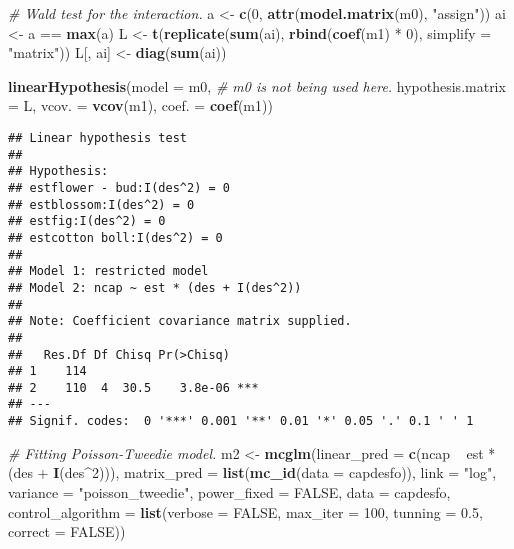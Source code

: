 \documentclass[9pt,a5paper,]{book}
\newenvironment{Shaded}{}{}
\newcommand{\KeywordTok}[1]{\textbf{{#1}}}
\newcommand{\DataTypeTok}[1]{\underline{{#1}}}
\newcommand{\DecValTok}[1]{{#1}}
\newcommand{\FloatTok}[1]{{#1}}
\newcommand{\StringTok}[1]{{#1}}
\newcommand{\CommentTok}[1]{\textit{{#1}}}
\newcommand{\OtherTok}[1]{{#1}}
\newcommand{\NormalTok}[1]{{#1}}
\renewenvironment{Shaded}{\color{inputcolor}}{}
\renewcommand{\DataTypeTok}[1]{{#1}}
\theoremstyle{definition}
\theoremstyle{definition}
\theoremstyle{remark}
\begin{document}
\begin{Shaded}
\begin{Highlighting}[]
\CommentTok{# Wald test for the interaction.}
\NormalTok{a <-}\StringTok{ }\KeywordTok{c}\NormalTok{(}\DecValTok{0}\NormalTok{, }\KeywordTok{attr}\NormalTok{(}\KeywordTok{model.matrix}\NormalTok{(m0), }\StringTok{"assign"}\NormalTok{))}
\NormalTok{ai <-}\StringTok{ }\NormalTok{a ==}\StringTok{ }\KeywordTok{max}\NormalTok{(a)}
\NormalTok{L <-}\StringTok{ }\KeywordTok{t}\NormalTok{(}\KeywordTok{replicate}\NormalTok{(}\KeywordTok{sum}\NormalTok{(ai), }\KeywordTok{rbind}\NormalTok{(}\KeywordTok{coef}\NormalTok{(m1) *}\StringTok{ }\DecValTok{0}\NormalTok{), }\DataTypeTok{simplify =} \StringTok{"matrix"}\NormalTok{))}
\NormalTok{L[, ai] <-}\StringTok{ }\KeywordTok{diag}\NormalTok{(}\KeywordTok{sum}\NormalTok{(ai))}

\KeywordTok{linearHypothesis}\NormalTok{(}\DataTypeTok{model =} \NormalTok{m0, }\CommentTok{# m0 is not being used here.}
                 \DataTypeTok{hypothesis.matrix =} \NormalTok{L,}
                 \DataTypeTok{vcov. =} \KeywordTok{vcov}\NormalTok{(m1),}
                 \DataTypeTok{coef. =} \KeywordTok{coef}\NormalTok{(m1))}
\end{Highlighting}
\end{Shaded}

\begin{verbatim}
## Linear hypothesis test
## 
## Hypothesis:
## estflower - bud:I(des^2) = 0
## estblossom:I(des^2) = 0
## estfig:I(des^2) = 0
## estcotton boll:I(des^2) = 0
## 
## Model 1: restricted model
## Model 2: ncap ~ est * (des + I(des^2))
## 
## Note: Coefficient covariance matrix supplied.
## 
##   Res.Df Df Chisq Pr(>Chisq)    
## 1    114                        
## 2    110  4  30.5    3.8e-06 ***
## ---
## Signif. codes:  0 '***' 0.001 '**' 0.01 '*' 0.05 '.' 0.1 ' ' 1
\end{verbatim}

\begin{Shaded}
\begin{Highlighting}[]
\CommentTok{# Fitting Poisson-Tweedie model.}
\NormalTok{m2 <-}\StringTok{ }\KeywordTok{mcglm}\NormalTok{(}\DataTypeTok{linear_pred =} \KeywordTok{c}\NormalTok{(ncap ~}\StringTok{ }\NormalTok{est *}\StringTok{ }\NormalTok{(des +}\StringTok{ }\KeywordTok{I}\NormalTok{(des^}\DecValTok{2}\NormalTok{))),}
            \DataTypeTok{matrix_pred =} \KeywordTok{list}\NormalTok{(}\KeywordTok{mc_id}\NormalTok{(}\DataTypeTok{data =} \NormalTok{capdesfo)),}
            \DataTypeTok{link =} \StringTok{"log"}\NormalTok{,}
            \DataTypeTok{variance =} \StringTok{"poisson_tweedie"}\NormalTok{,}
            \DataTypeTok{power_fixed =} \OtherTok{FALSE}\NormalTok{,}
            \DataTypeTok{data =} \NormalTok{capdesfo,}
            \DataTypeTok{control_algorithm =} \KeywordTok{list}\NormalTok{(}\DataTypeTok{verbose =} \OtherTok{FALSE}\NormalTok{,}
                                     \DataTypeTok{max_iter =} \DecValTok{100}\NormalTok{,}
                                     \DataTypeTok{tunning =} \FloatTok{0.5}\NormalTok{,}
                                     \DataTypeTok{correct =} \OtherTok{FALSE}\NormalTok{))}
\end{Highlighting}
\end{Shaded}
\end{document}
